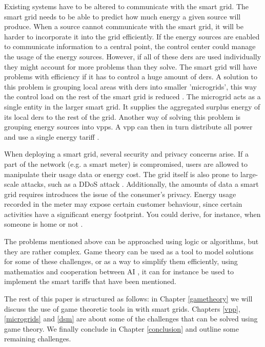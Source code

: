 Existing systems have to be altered to communicate with the smart grid. The smart grid needs to be able to predict how much energy a given source will produce. When a source cannot communicate with the smart grid, it will be harder to incorporate it into the grid efficiently. If the energy sources are enabled to communicate information to a central point, the control center could manage the usage of the energy sources. However, if all of these \acp{der} are used individually they might account for more problems than they solve. The smart grid will have problems with efficiency if it has to control a huge amount of \acp{der}. A solution to this problem is grouping local areas with \acp{der} into smaller 'microgrids', this way the control load on the rest of the smart grid is reduced \cite{HatziargyriouAsanoIravaniMarnay2007}. The microgrid acts as a single entity in the larger smart grid. It supplies the aggregated surplus energy of its local \acp{der} to the rest of the grid. Another way of solving this problem is grouping energy sources into \acp{vpp}. A \ac{vpp} can then in turn distribute all power and use a single energy tariff \cite{NikonowiczMilewski2012}.

When deploying a smart grid, several security and privacy concerns arise.  If a part of the network (e.g. a smart meter) is compromised, users are allowed to manipulate their usage data or energy cost. The grid itself is also prone to large-scale attacks, such as a DDoS attack \cite{McDanielMcLaughlin2009a}. Additionally, the amounts of data a smart grid requires introduces the issue of the consumer's privacy. Energy usage recorded in the meter may expose certain customer behaviour, since certain activities have a significant energy footprint. You could derive, for instance, when someone is home or not \cite{Molina-MarkhamShenoyFuEtAl2010}.

The problems mentioned above can be approached using logic or algorithms, but they are rather complex. Game theory can be used as a tool to model solutions for some of these challenges, or as a way to simplify them efficiently, using mathematics and cooperation between AI \cite{myerson2013game}, it can for instance be used to implement the smart tariffs that have been mentioned. 

The rest of this paper is structured as follows: in Chapter \ref{gametheory} we will discuss the use of game theoretic tools in with smart grids. Chapters \ref{vpp}, \ref{microgrids} and \ref{dsm} are about some of the challenges that can be solved using game theory. We finally conclude in Chapter \ref{conclusion} and outline some remaining challenges.